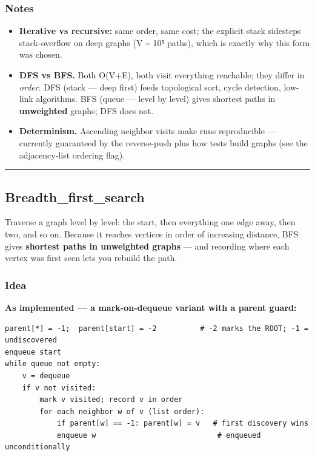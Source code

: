 \documentclass[
  10pt,
  letterpaper,
  onecolumn]{article}
\providecommand{\tightlist}{%
  \setlength{\itemsep}{0pt}\setlength{\parskip}{0pt}}
\begin{document}
\hypertarget{notes-6}{%
\subsubsection{Notes}\label{notes-6}}

\begin{itemize}
\tightlist
\item
  \textbf{Iterative vs recursive:} same order, same cost; the explicit
  stack sidesteps stack-overflow on deep graphs (V \textasciitilde{} 10⁵
  paths), which is exactly why this form was chosen.
\item
  \textbf{DFS vs BFS.} Both O(V+E), both visit everything reachable;
  they differ in \emph{order}. DFS (stack --- deep first) feeds
  topological sort, cycle detection, low-link algorithms. BFS (queue ---
  level by level) gives shortest paths in \textbf{unweighted} graphs;
  DFS does not.
\item
  \textbf{Determinism.} Ascending neighbor visits make runs reproducible
  --- currently guaranteed by the reverse-push plus how tests build
  graphs (see the adjacency-list ordering flag).
\end{itemize}

\begin{center}\rule{0.5\linewidth}{0.5pt}\end{center}

\hypertarget{breadth_first_search}{%
\subsection{Breadth\_first\_search}\label{breadth_first_search}}

Traverse a graph level by level: the start, then everything one edge
away, then two, and so on. Because it reaches vertices in order of
increasing distance, BFS gives \textbf{shortest paths in unweighted
graphs} --- and recording where each vertex was first seen lets you
rebuild the path.

\hypertarget{idea-8}{%
\subsubsection{Idea}\label{idea-8}}

\textbf{As implemented --- a mark-on-dequeue variant with a parent
guard:}

\begin{verbatim}
parent[*] = -1;  parent[start] = -2          # -2 marks the ROOT; -1 = undiscovered
enqueue start
while queue not empty:
    v = dequeue
    if v not visited:
        mark v visited; record v in order
        for each neighbor w of v (list order):
            if parent[w] == -1: parent[w] = v   # first discovery wins
            enqueue w                            # enqueued unconditionally
\end{verbatim}
\end{document}
